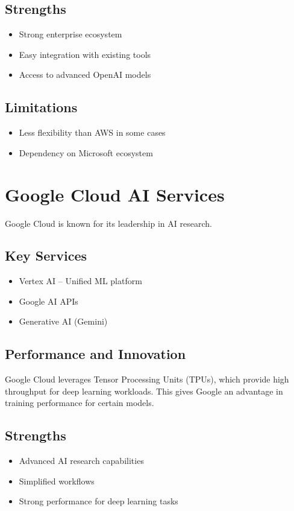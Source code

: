 \documentclass[conference]{IEEEtran}
\begin{document}
	\subsection{Strengths}
	\begin{itemize}
		\item Strong enterprise ecosystem
		\item Easy integration with existing tools
		\item Access to advanced OpenAI models
	\end{itemize}
	
	\subsection{Limitations}
	\begin{itemize}
		\item Less flexibility than AWS in some cases
		\item Dependency on Microsoft ecosystem
	\end{itemize}
	
	\section{Google Cloud AI Services}
	Google Cloud is known for its leadership in AI research.
	
	\subsection{Key Services}
	\begin{itemize}
		\item Vertex AI – Unified ML platform
		\item Google AI APIs
		\item Generative AI (Gemini)
	\end{itemize}
	
	\subsection{Performance and Innovation}
	Google Cloud leverages Tensor Processing Units (TPUs), which provide high throughput for deep learning workloads. This gives Google an advantage in training performance for certain models.
	
	\subsection{Strengths}
	\begin{itemize}
		\item Advanced AI research capabilities
		\item Simplified workflows
		\item Strong performance for deep learning tasks
	\end{itemize}
	
\end{document}
